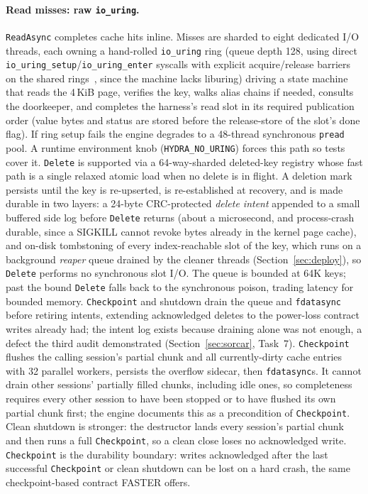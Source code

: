 \documentclass{article}
\begin{document}
\paragraph{Read misses: raw \texttt{io\_uring}.}
\texttt{ReadAsync} completes cache hits inline. Misses are sharded to eight dedicated I/O threads, each owning a hand-rolled \texttt{io\_uring} ring (queue depth 128, using direct \texttt{io\_uring\_setup}/\texttt{io\_uring\_enter} syscalls with explicit acquire/release barriers on the shared rings~\cite{iouring}, since the machine lacks liburing) driving a state machine that reads the 4\,KiB page, verifies the key, walks alias chains if needed, consults the doorkeeper, and completes the harness's read slot in its required publication order (value bytes and status are stored before the release-store of the slot's done flag). If ring setup fails the engine degrades to a 48-thread synchronous \texttt{pread} pool. A runtime environment knob (\texttt{HYDRA\_NO\_URING}) forces this path so tests cover it. \texttt{Delete} is supported via a 64-way-sharded deleted-key registry whose fast path is a single relaxed atomic load when no delete is in flight. A deletion mark persists until the key is re-upserted, is re-established at recovery, and is made durable in two layers: a 24-byte CRC-protected \emph{delete intent} appended to a small buffered side log before \texttt{Delete} returns (about a microsecond, and process-crash durable, since a SIGKILL cannot revoke bytes already in the kernel page cache), and on-disk tombstoning of every index-reachable slot of the key, which runs on a background \emph{reaper} queue drained by the cleaner threads (Section~\ref{sec:deploy}), so \texttt{Delete} performs no synchronous slot I/O. The queue is bounded at 64K keys; past the bound \texttt{Delete} falls back to the synchronous poison, trading latency for bounded memory. \texttt{Checkpoint} and shutdown drain the queue and \texttt{fdatasync} before retiring intents, extending acknowledged deletes to the power-loss contract writes already had; the intent log exists because draining alone was not enough, a defect the third audit demonstrated (Section~\ref{sec:sorcar}, Task~7). \texttt{Checkpoint} flushes the calling session's partial chunk and all currently-dirty cache entries with 32 parallel workers, persists the overflow sidecar, then \texttt{fdatasync}s. It cannot drain other sessions' partially filled chunks, including idle ones, so completeness requires every other session to have been stopped or to have flushed its own partial chunk first; the engine documents this as a precondition of \texttt{Checkpoint}. Clean shutdown is stronger: the destructor lands every session's partial chunk and then runs a full \texttt{Checkpoint}, so a clean close loses no acknowledged write. \texttt{Checkpoint} is the durability boundary: writes acknowledged after the last successful \texttt{Checkpoint} or clean shutdown can be lost on a hard crash, the same checkpoint-based contract FASTER offers.
\end{document}
